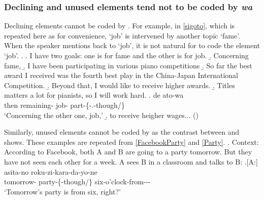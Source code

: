 \subsubsection{Declining and unused elements tend not to be coded by \textit{wa}}\label{Par:Wa:DecUnusedWa}

Declining elements cannot be coded by .
For example, in \ref{sigoto}, which is repeated here as \Next for convenience,
`job' is intervened by another topic `fame'.
When the speaker mentions back to `job',
it is not natural for  to code the element `job'.
%
\ex.
 \a. I have two goals: one is for fame and the other is for job.
 \b. Concerning fame,
 \b. I have been participating in various piano competitions
 \b. So far the best award I received was the fourth best play in the China-Japan International Competition.
 \b. Beyond that, I would like to receive higher awards.
 \b. Titles matters a lot for pianists, so I will work hard.
 \bg. de ato-wa   \\
 	then remaining- job- part-\{-.-though/\} \\
	`Concerning the other one, job,'
 \b. to receive heigher wages...
\hfill{()}
%

Similarly,
unused elements cannot be coded by 
as the contrast between \Next and \NNext shows.
These examples are repeated from \ref{FacebookParty} and \ref{Party}.
%
\ex. Context: According to Facebook, both A and B are going to a party tomorrow. But they have not seen each other for a week. A sees B in a classroom and talks to B:
	\a.[A:] asita-no  roku-zi-kara-da-yo-ne \\
		tomorrow- party-\{-though/\} six-o'clock-from--\ab{fp}- \\
		`Tomorrow's party is from six, right?' 


